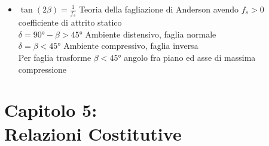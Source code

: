 \documentclass[a4paper]{article}
\begin{document}
\begin{itemize}
	\item $\tan(2\beta)=\frac{1}{f_s}$ Teoria della fagliazione di Anderson avendo $f_s>0$ coefficiente di attrito statico\\
	$\delta = 90°-\beta > 45°$ Ambiente distensivo, faglia normale\\
	$\delta = \beta < 45°$ Ambiente compressivo, faglia inversa\\ 
	Per faglia trasforme $\beta<45°$ angolo fra piano ed asse di massima compressione
	
\end{itemize}

\section{Capitolo 5:\\ Relazioni Costitutive}
\end{document}
